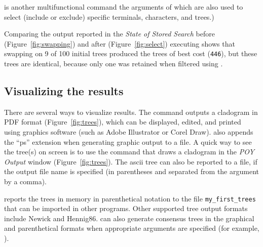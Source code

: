 is another multifunctional command the arguments of which are also used to select (include or exclude) specific terminals, characters, and trees.)

Comparing the output reported in the \emph{State of Stored Search} before (Figure~\ref{fig:swapping}) and after (Figure~\ref{fig:select}) executing  shows that swapping on 9 of 100 initial trees produced the trees of best cost (\texttt{446}), but these trees are identical, because only one was retained when filtered using .

\subsection{Visualizing the results}

There are several ways to visualize results. The command
 outputs a cladogram in PDF format (Figure~\ref{fig:trees}), which can be displayed, edited, and printed using graphics software (such as Adobe Illustrator or Corel Draw). \poy also appends the ``ps'' extension when generating graphic output to a file. A quick way to see the tree(s) on screen is to use the command  that draws a cladogram in the \emph{POY Output} window (Figure~\ref{fig:trees}). The ascii tree can also be reported to a file, if the output file name is specified (in parentheses and separated from the argument  by a comma).

 reports the trees in memory in parenthetical notation to the file \texttt{my\_first\_trees} that can be imported in other programs. Other supported tree output formats include Newick and Hennig86.  can also generate consensus trees in the graphical and parenthetical formats when appropriate arguments are specified (for example, ).

